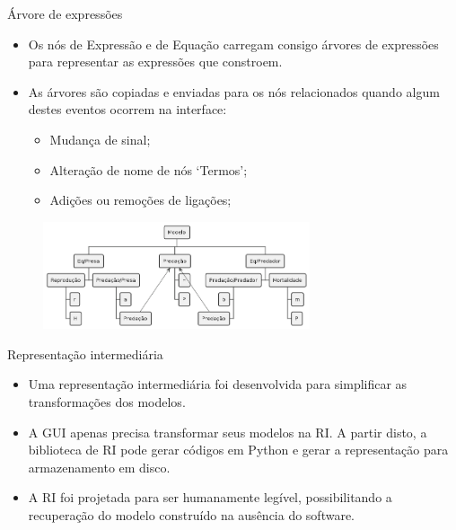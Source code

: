 \begin{frame}{Árvore de expressões}
    \begin{itemize}
        \item Os nós de Expressão e de Equação carregam consigo árvores de expressões para representar as expressões que constroem.
        \item As árvores são copiadas e enviadas para os nós relacionados quando algum destes eventos ocorrem na interface:
        \begin{itemize}
            \item Mudança de sinal;
            \item Alteração de nome de nós `Termos';
            \item Adições ou remoções de ligações;
        \end{itemize}
    \end{itemize}
    \begin{figure}
        \centering
        \includegraphics[width=0.7\textwidth]{contents/imgs/expr-tree.png}
    \end{figure}
\end{frame}

\begin{frame}{Representação intermediária}
    \begin{itemize}
        \item Uma representação intermediária foi desenvolvida para simplificar as transformações dos modelos.
        \item A GUI apenas precisa transformar seus modelos na RI. A partir disto, a biblioteca de RI pode gerar códigos em Python e gerar a representação para armazenamento em disco.
        \item A RI foi projetada para ser humanamente legível, possibilitando a recuperação do modelo construído na ausência do software.
    \end{itemize}
\end{frame}

